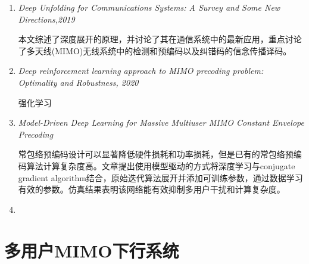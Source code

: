 \begin{enumerate}
    \item \emph{Deep Unfolding for Communications Systems: A Survey and Some New Directions,2019}\par 
        本文综述了深度展开的原理，并讨论了其在通信系统中的最新应用，重点讨论了多天线(MIMO)无线系统中的检测和预编码以及纠错码的信念传播译码。
    \item \emph{Deep reinforcement learning approach to MIMO precoding problem: Optimality and Robustness, 2020}\par 
        强化学习
    \item \emph{Model-Driven Deep Learning for Massive Multiuser MIMO Constant Envelope Precoding} \par 
        常包络预编码设计可以显著降低硬件损耗和功率损耗，但是已有的常包络预编码算法计算复杂度高。文章提出使用模型驱动的方式将深度学习与conjugate gradient algorithm结合，原始迭代算法展开并添加可训练参数，通过数据学习有效的参数。仿真结果表明该网络能有效抑制多用户干扰和计算复杂度。
    \item \emph{}
    
\end{enumerate}

\section{多用户MIMO下行系统}
